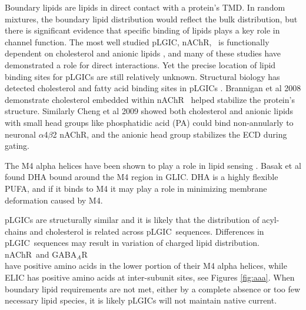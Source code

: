 \documentclass[12pt]{ruthesis_nofloat}
\newcommand{\nachr}{nAChR}
\newcommand{\plgic}{pLGIC}
\newcommand{\gabaa}{GABA$_A$R}
\begin{document}
Boundary lipids are lipids in direct contact with a protein's TMD.  In random mixtures, the boundary lipid distribution would reflect the bulk distribution, but there is significant evidence that specific binding of lipids plays a key role in channel function. The most well studied \plgic, \nachr, ~is functionally dependent on cholesterol and anionic lipids \citep{Dalziel1980,Ellena1983,M.CriadoH.Eibl1982,Fong1986,Fong1987,Jones1988a,Sunshine1994,DaCosta2009b}, and many of these studies have demonstrated a role for direct interactions. Yet the precise location of lipid binding sites for \plgic s are still relatively unknown. Structural biology has detected cholesterol and fatty acid binding sites in \plgic s \citep{Addona1998,Althoff2014,Laverty2017,Basak2017,Henault2019}. Brannigan et al 2008 \cite{Brannigan2008} demonstrate cholesterol embedded within \nachr~ helped stabilize the protein's structure. Similarly Cheng et al 2009 \cite{Cheng2009} showed both cholesterol and anionic lipids with small head groups like phosphatidic acid (PA) could bind non-annularly to neuronal $\alpha$4$\beta$2 nAChR, and the anionic head group stabilizes the ECD during gating. %

The M4 alpha helices have been shown to play a role in lipid sensing \citep{Henault2015}.  Basak et al \cite{Basak2017} found DHA bound around the M4 region in GLIC. DHA is a highly flexible PUFA, and if it binds to M4 it may play a role in minimizing membrane deformation caused by M4.


\plgic s are structurally similar and it is likely that the distribution of acyl-chains and cholesterol is related across \plgic~sequences. Differences in \plgic~sequences may result in variation of charged lipid distribution. \nachr~and \gabaa~\\have positive amino acids in the lower portion of their M4 alpha helices, while ELIC has positive amino acids at inter-subunit sites, see Figures \ref{fig:aaa}. When boundary lipid requirements are not met, either by a complete absence or too few necessary lipid species, it is likely \plgic s will not maintain native current. 
\end{document}
